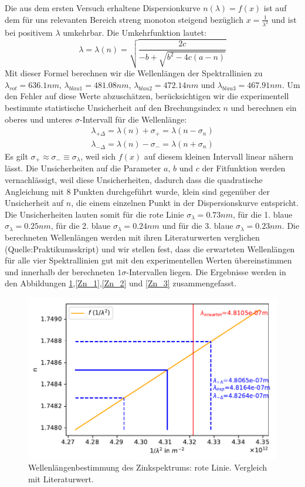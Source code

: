 \documentclass[12pt,a4paper]{article}
\begin{document}
Die aus dem ersten Versuch erhaltene Dispersionkurve $n(\lambda)=f(x)$ ist auf dem für uns relevanten Bereich streng monoton steigend bezüglich $x=\frac{1}{\lambda^2}$ und ist bei positivem $\lambda$ umkehrbar. Die Umkehrfunktion lautet:
\begin{equation}
\lambda=\lambda(n)=\sqrt{\frac{2c}{-b+\sqrt{b^2-4c(a-n)}}}
\end{equation} 
Mit dieser Formel berechnen wir die Wellenlängen der Spektrallinien zu $\lambda_{rot}=636.1nm$, $\lambda_{blau1}=481.08nm$, $\lambda_{blau2}=472.14nm$ und $\lambda_{blau3}=467.91nm$. Um den Fehler auf diese Werte abzuschätzen, berücksichtigen wir die experimentell bestimmte statistische Unsicherheit auf den Brechungsindex $n$ und berechnen ein oberes und unteres $\sigma$-Intervall für die Wellenlänge:
\begin{align}
\lambda_{+\Delta}=\lambda(n)+\sigma_{+}=\lambda(n-\sigma_n)\\
\lambda_{-\Delta}=\lambda(n)-\sigma_{-}=\lambda(n+\sigma_n)
\end{align}
Es gilt $\sigma_+\approx\sigma_-\equiv\sigma_{\lambda}$, weil sich $f(x)$ auf diesem kleinen Intervall linear nähern lässt. Die Unsicherheiten auf die Parameter $a$, $b$ und $c$ der Fitfunktion werden vernachlässigt, weil diese Unsicherheiten, dadurch dass die quadratische Angleichung mit 8 Punkten durchgeführt wurde, klein sind gegenüber der Unsicherheit auf $n$, die einem einzelnen Punkt in der Dispersionskurve entspricht. Die Unsicherheiten lauten somit für die rote Linie $\sigma_{\lambda}=0.73nm$, für die 1. blaue $\sigma_{\lambda}=0.25nm$, für die 2. blaue $\sigma_{\lambda}=0.24nm$ und für die 3. blaue $\sigma_{\lambda}=0.23nm$. Die berechneten Wellenlängen werden mit ihren Literaturwerten verglichen (Quelle:Praktikumsskript) und wir stellen fest, dass die erwarteten Wellenlängen für alle vier Spektrallinien gut mit den experimentellen Werten übereinstimmen und innerhalb der berechneten $1\sigma$-Intervallen liegen. Die Ergebnisse werden in den Abbildungen \ref{Zn_0},\ref{Zn_1},\ref{Zn_2} und \ref{Zn_3} zusammengefasst.
\begin{figure}[H]
	\centering
	\includegraphics[width=0.7\linewidth]{Python/Zn_0.pdf}
	\caption{Wellenlängenbestimmung des Zinkspektrums: rote Linie. Vergleich mit Literaturwert.}
	\label{Zn_0}
\end{figure}
\end{document}
